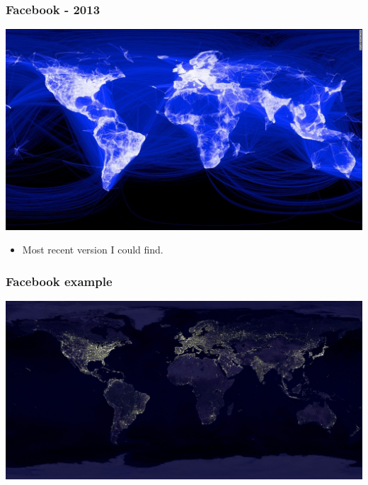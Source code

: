 \documentclass{beamer} %
\newcommand{\1}{\mathbb{1}}
\begin{document}
\begin{frame}[t]\frametitle{Facebook - 2013}
	\begin{center}
		\includegraphics[scale = 0.275]{./visualization/facebook2013.jpg}
	\end{center}
	\begin{itemize}
		\item Most recent version I could find.
	\end{itemize}
\end{frame}

\begin{frame}[t]\frametitle{Facebook example}
	\begin{center}
		\includegraphics[scale = 0.18]{./visualization/earth_night.jpg}
	\end{center}
\end{frame}
\end{document}
